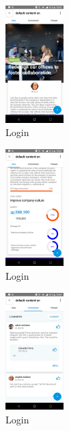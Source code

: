 \begin{figure}[!h]
	\begin{center}
		\includegraphics[width=0.2\textwidth]{./img/anexo1/ver_idea_inicio.png}
		\caption{Login}
		\label{fig:ver_idea_inicio}
	\end{center}
\end{figure}

\begin{figure}[!h]
	\begin{center}
		\includegraphics[width=0.2\textwidth]{./img/anexo1/ver_idea_inicio_cont.png}
		\caption{Login}
		\label{fig:ver_idea_inicio_cont}
	\end{center}
\end{figure}

\begin{figure}[!h]
	\begin{center}
		\includegraphics[width=0.2\textwidth]{./img/anexo1/ver_idea_comentarios.png}
		\caption{Login}
		\label{fig:ver_idea_comentarios}
	\end{center}
\end{figure}

